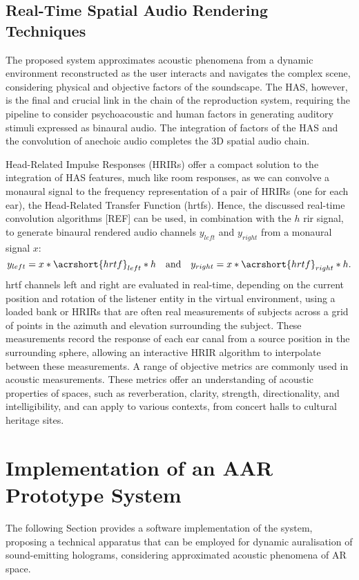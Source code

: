\subsection{Real-Time Spatial Audio Rendering Techniques}
The proposed system approximates acoustic phenomena from a dynamic environment reconstructed as the user interacts and navigates the complex scene, considering physical and objective factors of the soundscape. The HAS, however, is the final and crucial link in the chain of the reproduction system, requiring the pipeline to consider psychoacoustic and human factors in generating auditory stimuli expressed as binaural audio. The integration of factors of the HAS and the convolution of anechoic audio completes the 3D spatial audio chain.\par
Head-Related Impulse Responses (HRIRs) offer a compact solution to the integration of HAS features, much like room responses, as we can convolve a monaural signal to the frequency representation of a pair of HRIRs (one for each ear), the Head-Related Transfer Function (\acrshort{hrtf}s). Hence, the discussed real-time convolution algorithms [REF] can be used, in combination with the $h$ \acrshort{rir} signal, to generate binaural rendered audio channels $y_{left}$ and $y_{right}$ from a monaural signal $x$:
\begin{equation}
    y_{left} = x * \acrshort{hrtf}_{left} * h \quad \textrm{and} \quad  y_{right} = x * \acrshort{hrtf}_{right} * h \textrm{.}
\end{equation}
\acrshort{hrtf} channels left and right are evaluated in real-time, depending on the current position and rotation of the listener entity in the virtual environment, using a loaded bank or HRIRs that are often real measurements of subjects across a grid of points in the azimuth and elevation surrounding the subject. These measurements record the response of each ear canal from a source position in the surrounding sphere, allowing an interactive HRIR algorithm to interpolate between these measurements. A range of objective metrics are commonly used in acoustic measurements. These metrics offer an understanding of acoustic properties of spaces, such as reverberation, clarity, strength, directionality, and intelligibility, and can apply to various contexts, from concert halls to cultural heritage sites. 

\section{Implementation of an AAR Prototype System}
The following Section provides a software implementation of the system, proposing a technical apparatus that can be employed for dynamic auralisation of sound-emitting holograms, considering approximated acoustic phenomena of AR space.

